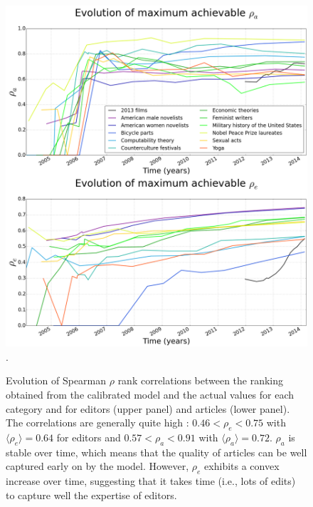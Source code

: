 







\begin{figure}[!t]
\centering
\includegraphics[width=0.9\columnwidth]{../Figures/rho_combined.png}.
\caption{Evolution of Spearman $\rho$ rank correlations between the ranking obtained from the calibrated model and the actual values for each category and for editors (upper panel)  and articles (lower panel). The correlations are generally quite high : $ 0.46 < \rho_e < 0.75$ with $\langle \rho_e\rangle = 0.64$ for editors and $0.57 < \rho_a < 0.91$ with $\langle \rho_a\rangle = 0.72$. $\rho_{a}$  is stable over time, which means that the quality of articles can be well captured early on by the model. However, $\rho_e$ exhibits a convex increase over time, suggesting that it takes time (i.e., lots of edits) to capture well the expertise of editors.}
\label{fig:rhotime}
\end{figure}

	




